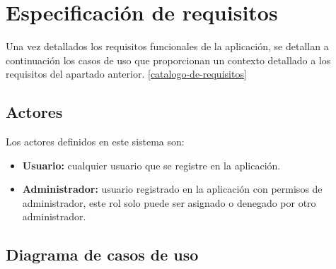 \section{Especificación de requisitos}

Una vez detallados los requisitos funcionales de la aplicación, se detallan a continuación los casos de uso que proporcionan un contexto detallado a los requisitos del apartado anterior. \ref{catalogo-de-requisitos}

\subsection{Actores}
Los actores definidos en este sistema son:
\begin{itemize}
\tightlist
\item
    \textbf{Usuario:} cualquier usuario que se registre en la aplicación.
\item
    \textbf{Administrador:} usuario registrado en la aplicación con permisos de administrador, este rol solo puede ser asignado o denegado por otro administrador.
\end{itemize}

\subsection{Diagrama de casos de uso}

